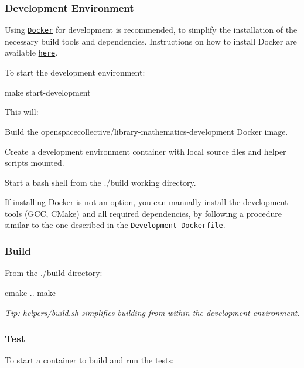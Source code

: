 \subsubsection*{Development Environment}

Using \href{https://www.docker.com}{\tt Docker} for development is recommended, to simplify the installation of the necessary build tools and dependencies. Instructions on how to install Docker are available \href{https://docs.docker.com/install/}{\tt here}.

To start the development environment\+:


\begin{DoxyCode}
make start-development
\end{DoxyCode}


This will\+:


\begin{DoxyEnumerate}
\item Build the {\ttfamily openspacecollective/library-\/mathematics-\/development} Docker image.
\item Create a development environment container with local source files and helper scripts mounted.
\item Start a {\ttfamily bash} shell from the {\ttfamily ./build} working directory.
\end{DoxyEnumerate}

If installing Docker is not an option, you can manually install the development tools (G\+CC, C\+Make) and all required dependencies, by following a procedure similar to the one described in the \href{./docker/development/Dockerfile}{\tt Development Dockerfile}.

\subsubsection*{Build}

From the {\ttfamily ./build} directory\+:


\begin{DoxyCode}
cmake ..
make
\end{DoxyCode}


{\itshape Tip\+: {\ttfamily helpers/build.\+sh} simplifies building from within the development environment.}

\subsubsection*{Test}

To start a container to build and run the tests\+:


